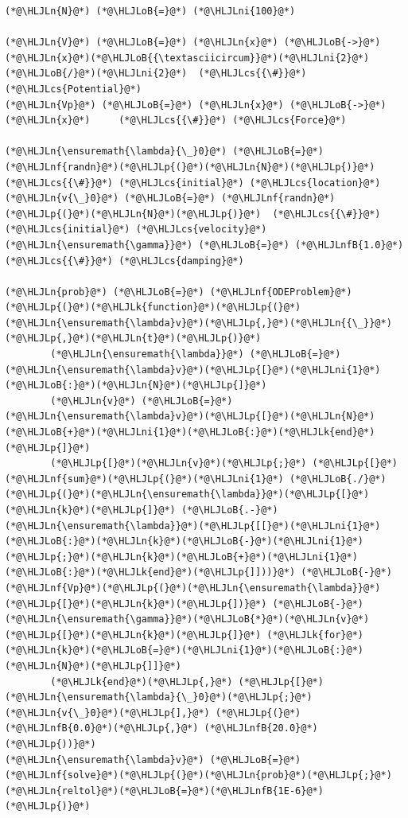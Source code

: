 \documentclass[12pt,a4paper]{article}
\newcommand{\HLJLk}[1]{\textcolor[RGB]{148,91,176}{\textbf{#1}}}
\newcommand{\HLJLn}[1]{#1}
\newcommand{\HLJLnf}[1]{\textcolor[RGB]{66,102,213}{#1}}
\newcommand{\HLJLnfB}[1]{\textcolor[RGB]{59,151,46}{#1}}
\newcommand{\HLJLni}[1]{\textcolor[RGB]{59,151,46}{#1}}
\newcommand{\HLJLoB}[1]{\textcolor[RGB]{102,102,102}{\textbf{#1}}}
\newcommand{\HLJLp}[1]{#1}
\newcommand{\HLJLcs}[1]{\textcolor[RGB]{153,153,119}{\textit{#1}}}
\begin{document}
\begin{lstlisting}
(*@\HLJLn{N}@*) (*@\HLJLoB{=}@*) (*@\HLJLni{100}@*)

(*@\HLJLn{V}@*) (*@\HLJLoB{=}@*) (*@\HLJLn{x}@*) (*@\HLJLoB{->}@*) (*@\HLJLn{x}@*)(*@\HLJLoB{{\textasciicircum}}@*)(*@\HLJLni{2}@*)(*@\HLJLoB{/}@*)(*@\HLJLni{2}@*)  (*@\HLJLcs{{\#}}@*) (*@\HLJLcs{Potential}@*)
(*@\HLJLn{Vp}@*) (*@\HLJLoB{=}@*) (*@\HLJLn{x}@*) (*@\HLJLoB{->}@*) (*@\HLJLn{x}@*)     (*@\HLJLcs{{\#}}@*) (*@\HLJLcs{Force}@*)

(*@\HLJLn{\ensuremath{\lambda}{\_}0}@*) (*@\HLJLoB{=}@*) (*@\HLJLnf{randn}@*)(*@\HLJLp{(}@*)(*@\HLJLn{N}@*)(*@\HLJLp{)}@*)  (*@\HLJLcs{{\#}}@*) (*@\HLJLcs{initial}@*) (*@\HLJLcs{location}@*)
(*@\HLJLn{v{\_}0}@*) (*@\HLJLoB{=}@*) (*@\HLJLnf{randn}@*)(*@\HLJLp{(}@*)(*@\HLJLn{N}@*)(*@\HLJLp{)}@*)  (*@\HLJLcs{{\#}}@*) (*@\HLJLcs{initial}@*) (*@\HLJLcs{velocity}@*)
(*@\HLJLn{\ensuremath{\gamma}}@*) (*@\HLJLoB{=}@*) (*@\HLJLnfB{1.0}@*)    (*@\HLJLcs{{\#}}@*) (*@\HLJLcs{damping}@*)

(*@\HLJLn{prob}@*) (*@\HLJLoB{=}@*) (*@\HLJLnf{ODEProblem}@*)(*@\HLJLp{(}@*)(*@\HLJLk{function}@*)(*@\HLJLp{(}@*)(*@\HLJLn{\ensuremath{\lambda}v}@*)(*@\HLJLp{,}@*)(*@\HLJLn{{\_}}@*)(*@\HLJLp{,}@*)(*@\HLJLn{t}@*)(*@\HLJLp{)}@*) 
        (*@\HLJLn{\ensuremath{\lambda}}@*) (*@\HLJLoB{=}@*) (*@\HLJLn{\ensuremath{\lambda}v}@*)(*@\HLJLp{[}@*)(*@\HLJLni{1}@*)(*@\HLJLoB{:}@*)(*@\HLJLn{N}@*)(*@\HLJLp{]}@*)
        (*@\HLJLn{v}@*) (*@\HLJLoB{=}@*) (*@\HLJLn{\ensuremath{\lambda}v}@*)(*@\HLJLp{[}@*)(*@\HLJLn{N}@*)(*@\HLJLoB{+}@*)(*@\HLJLni{1}@*)(*@\HLJLoB{:}@*)(*@\HLJLk{end}@*)(*@\HLJLp{]}@*)
        (*@\HLJLp{[}@*)(*@\HLJLn{v}@*)(*@\HLJLp{;}@*) (*@\HLJLp{[}@*)(*@\HLJLnf{sum}@*)(*@\HLJLp{(}@*)(*@\HLJLni{1}@*) (*@\HLJLoB{./}@*) (*@\HLJLp{(}@*)(*@\HLJLn{\ensuremath{\lambda}}@*)(*@\HLJLp{[}@*)(*@\HLJLn{k}@*)(*@\HLJLp{]}@*) (*@\HLJLoB{.-}@*) (*@\HLJLn{\ensuremath{\lambda}}@*)(*@\HLJLp{[[}@*)(*@\HLJLni{1}@*)(*@\HLJLoB{:}@*)(*@\HLJLn{k}@*)(*@\HLJLoB{-}@*)(*@\HLJLni{1}@*)(*@\HLJLp{;}@*)(*@\HLJLn{k}@*)(*@\HLJLoB{+}@*)(*@\HLJLni{1}@*)(*@\HLJLoB{:}@*)(*@\HLJLk{end}@*)(*@\HLJLp{]]))}@*) (*@\HLJLoB{-}@*) (*@\HLJLnf{Vp}@*)(*@\HLJLp{(}@*)(*@\HLJLn{\ensuremath{\lambda}}@*)(*@\HLJLp{[}@*)(*@\HLJLn{k}@*)(*@\HLJLp{])}@*) (*@\HLJLoB{-}@*)  (*@\HLJLn{\ensuremath{\gamma}}@*)(*@\HLJLoB{*}@*)(*@\HLJLn{v}@*)(*@\HLJLp{[}@*)(*@\HLJLn{k}@*)(*@\HLJLp{]}@*) (*@\HLJLk{for}@*) (*@\HLJLn{k}@*)(*@\HLJLoB{=}@*)(*@\HLJLni{1}@*)(*@\HLJLoB{:}@*)(*@\HLJLn{N}@*)(*@\HLJLp{]]}@*)
        (*@\HLJLk{end}@*)(*@\HLJLp{,}@*) (*@\HLJLp{[}@*)(*@\HLJLn{\ensuremath{\lambda}{\_}0}@*)(*@\HLJLp{;}@*) (*@\HLJLn{v{\_}0}@*)(*@\HLJLp{],}@*) (*@\HLJLp{(}@*)(*@\HLJLnfB{0.0}@*)(*@\HLJLp{,}@*) (*@\HLJLnfB{20.0}@*)(*@\HLJLp{))}@*)
(*@\HLJLn{\ensuremath{\lambda}v}@*) (*@\HLJLoB{=}@*) (*@\HLJLnf{solve}@*)(*@\HLJLp{(}@*)(*@\HLJLn{prob}@*)(*@\HLJLp{;}@*) (*@\HLJLn{reltol}@*)(*@\HLJLoB{=}@*)(*@\HLJLnfB{1E-6}@*)(*@\HLJLp{)}@*)


\end{lstlisting}
\end{document}
